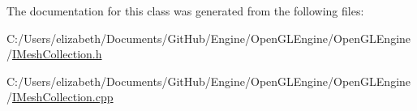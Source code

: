 The documentation for this class was generated from the following files\+:\begin{DoxyCompactItemize}
\item 
C\+:/\+Users/elizabeth/\+Documents/\+Git\+Hub/\+Engine/\+Open\+G\+L\+Engine/\+Open\+G\+L\+Engine/\hyperlink{_i_mesh_collection_8h}{I\+Mesh\+Collection.\+h}\item 
C\+:/\+Users/elizabeth/\+Documents/\+Git\+Hub/\+Engine/\+Open\+G\+L\+Engine/\+Open\+G\+L\+Engine/\hyperlink{_i_mesh_collection_8cpp}{I\+Mesh\+Collection.\+cpp}\end{DoxyCompactItemize}
